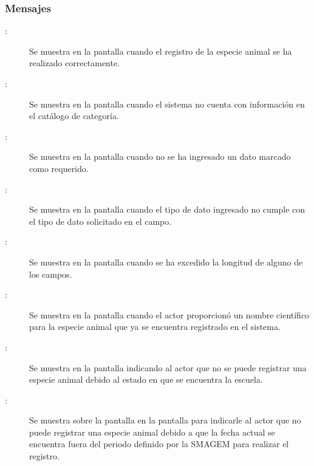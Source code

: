 \subsubsection{Mensajes}

    \begin{description}
      
        \item [:] Se muestra en la pantalla  cuando el registro de la especie animal se ha realizado correctamente.     
        
        \item [:] Se muestra en la pantalla  cuando el sistema no cuenta con información en el catálogo de categoría.
        
        \item [:] Se muestra en la pantalla  cuando no se ha ingresado un dato marcado como requerido.
        
         \item [:] Se muestra en la pantalla  cuando el tipo de dato ingresado no cumple con el tipo de dato solicitado en el campo.
        
        \item [:] Se muestra en la pantalla  cuando se ha excedido la longitud de alguno de los campos.
        
         \item [:] Se muestra en la pantalla  cuando el actor proporcionó un nombre científico  para la especie animal que ya se encuentra registrado en el sistema.
         
         \item[:] Se muestra en la pantalla  indicando al actor que no se puede registrar una especie animal debido al estado en que se encuentra la escuela.
       
       \item [:] Se muestra sobre la pantalla en la pantalla  para indicarle al actor que no puede registrar una especie animal debido a que la fecha actual se encuentra fuera del periodo definido por la SMAGEM para realizar el registro.
        
    \end{description}
